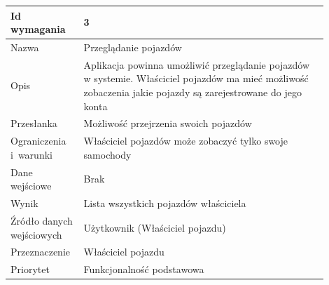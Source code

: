 \documentclass[12pt]{article}
\begin{document}
\begin{table}[H]
\begin{center}
	\begin{tabular}{|p{0.18\linewidth}|p{0.72\linewidth}|}%
	\hline
	Id wymagania 	& 3 				\\ \hline
	Nazwa			& Przeglądanie pojazdów \\ \hline
	Opis & Aplikacja powinna umożliwić przeglądanie pojazdów w systemie. Właściciel pojazdów ma mieć możliwość zobaczenia jakie pojazdy są zarejestrowane do jego konta
\\ \hline
	Przesłanka & Możliwość przejrzenia swoich pojazdów  \\ \hline
	Ograniczenia i~warunki & Właściciel pojazdów może zobaczyć tylko swoje samochody  \\ \hline
	Dane wejściowe & Brak  \\ \hline
	Wynik & Lista wszystkich pojazdów właściciela \\ \hline
	Źródło danych wejściowych & Użytkownik (Właściciel pojazdu) \\ \hline
	Przeznaczenie & Właściciel pojazdu \\ \hline
	Priorytet & Funkcjonalność podstawowa \\ \hline
	\end{tabular}

\end{center}
\end{table}
\end{document}
